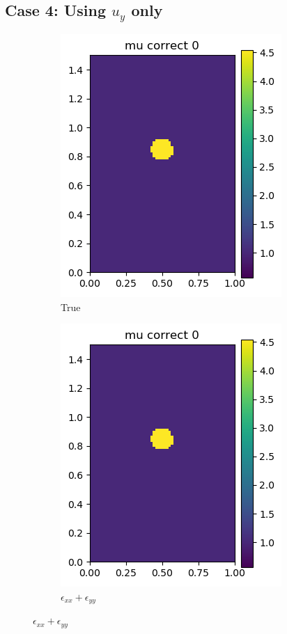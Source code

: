 \documentclass[12pt]{article}
\newcommand{\nhgscalefactor}{0.22}
\newcommand{\nhgfigheight}{3.8cm}
\begin{document}
\subsection{Case 4: Using $u_y$ only}
\pagebreak
\begin{figure}
  \centering
  \begin{subfigure}[b]{\nhgscalefactor\linewidth}
    \includegraphics[totalheight=\nhgfigheight]{Figures/strain/ex1/mucomp00.png}
    \caption{True}
  \end{subfigure}
   \begin{subfigure}[b]{\nhgscalefactor\linewidth}
    \includegraphics[totalheight=\nhgfigheight]{Figures/strain/ex1/mucomp00.png}
    \caption{$\epsilon_{xx}+\epsilon_{yy}$}

\end{subfigure}
\end{figure}
\end{document}
